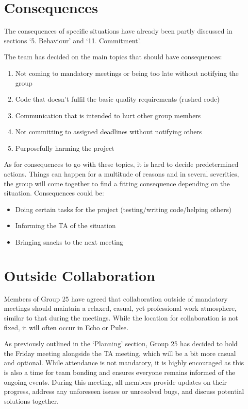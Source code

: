 \documentclass[sigconf,nonacm]{acmart}
\begin{document}
\section{Consequences}
The consequences of specific situations have already been partly discussed in sections ‘5. Behaviour’ and ‘11. Commitment’.

The team has decided on the main topics that should have consequences:
\begin{enumerate}
    \item Not coming to mandatory meetings or being too late without notifying the group
    \item Code that doesn’t fulfil the basic quality requirements (rushed code)
    \item Communication that is intended to hurt other group members
    \item Not committing to assigned deadlines without notifying others
    \item Purposefully harming the project
\end{enumerate}

As for consequences to go with these topics, it is hard to decide predetermined actions. Things can happen for a multitude of reasons and in several severities, the group will come together to find a fitting consequence depending on the situation. Consequences could be:

\begin{itemize}
    \item Doing certain tasks for the project (testing/writing code/helping others)
    \item Informing the TA of the situation
    \item Bringing snacks to the next meeting
\end{itemize}

\section{Outside Collaboration}
Members of Group 25 have agreed that collaboration outside of mandatory meetings should maintain a relaxed, casual, yet professional work atmosphere, similar to that during the meetings. While the location for collaboration is not fixed, it will often occur in Echo or Pulse.

As previously outlined in the ‘Planning’ section, Group 25 has decided to hold the Friday meeting alongside the TA meeting, which will be a bit more casual and optional. While attendance is not mandatory, it is highly encouraged as this is also a time for team bonding and ensures everyone remains informed of the ongoing events. During this meeting, all members provide updates on their progress, address any unforeseen issues or unresolved bugs, and discuss potential solutions together.
\end{document}
